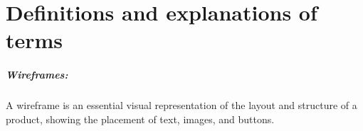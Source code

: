 
\chapter{Definitions and explanations of terms}

\paragraph{Wireframes:} A wireframe is an essential visual representation of the layout and structure of a product, showing the placement of text, images, and buttons.
